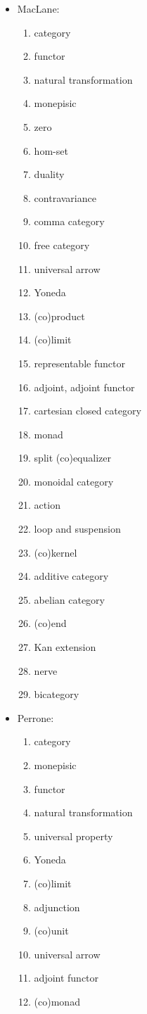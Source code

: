 \documentclass[11pt,openany]{book}
\begin{document}
\begin{itemize}
\item MacLane:~\cite{maclane_1998_cat_for_working_mathematician}
\begin{enumerate}
  \item category
  \item functor
  \item natural transformation
  \item monepisic
  \item zero
  \item hom-set
  \item duality
  \item contravariance
  \item comma category
  \item free category
  \item universal arrow
  \item Yoneda
  \item (co)product
  \item (co)limit
  \item representable functor
  \item adjoint, adjoint functor
  \item cartesian closed category
  \item monad
  \item split (co)equalizer
  \item monoidal category
  \item action
  \item loop and suspension
  \item (co)kernel
  \item additive category
  \item abelian category
  \item (co)end
  \item Kan extension
  \item nerve
  \item bicategory
\end{enumerate}

\item Perrone:~\cite{perrone_2019_cath_notes}
\begin{enumerate}
  \item category
  \item monepisic
  \item functor
  \item natural transformation
  \item universal property
  \item Yoneda
  \item (co)limit
  \item adjunction
  \item (co)unit
  \item universal arrow
  \item adjoint functor
  \item (co)monad
\end{enumerate}


\end{itemize}
\end{document}
